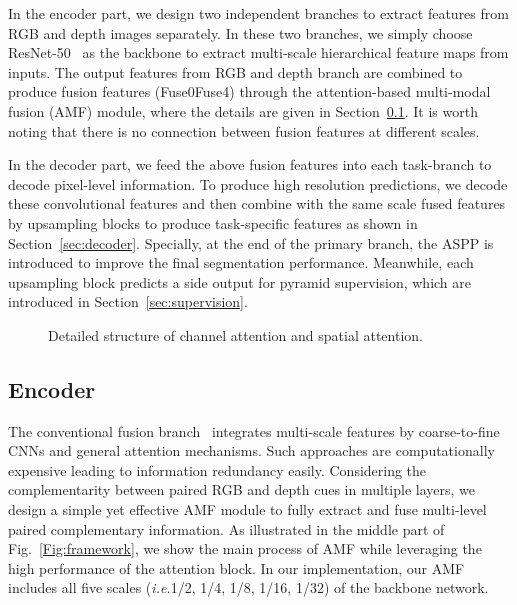 \documentclass[10pt,twocolumn,letterpaper]{article}
\begin{document}
In the encoder part, we design two independent branches to extract features from RGB and depth images separately. In these two branches, we simply choose ResNet-50~\cite{He:CVPR2016} as the backbone to extract multi-scale hierarchical feature maps from inputs. The output features from RGB and depth branch are combined to produce fusion features (Fuse0Fuse4) through the attention-based multi-modal fusion (AMF) module, where the details are given in Section~\ref{sec:encoder}. It is worth noting that there is no connection between fusion features at different scales.

In the decoder part, we feed the above fusion features into each task-branch to decode pixel-level information. To produce high resolution predictions, we decode these convolutional features and then combine with the same scale fused features by upsampling blocks to produce task-specific features as shown in Section~\ref{sec:decoder}. Specially, at the end of the primary branch, the ASPP is introduced to improve the final segmentation performance. Meanwhile, each upsampling block predicts a side output for pyramid supervision, which are introduced in Section~\ref{sec:supervision}. 
\begin{figure}[t]
	\centering
		
	\caption{Detailed structure of channel attention and spatial attention.}
	\label{Fig:Attention}
\end{figure}

\subsection{Encoder}\label{sec:encoder}
The conventional fusion branch~\cite{Hu:ICIP19,Tang:arXiv20} integrates multi-scale features by coarse-to-fine CNNs and general attention mechanisms. Such approaches are computationally expensive leading to information redundancy easily. Considering the complementarity between paired RGB and depth cues in multiple layers, we design a simple yet effective AMF module to fully extract and fuse multi-level paired complementary information. As illustrated in the middle part of Fig.~\ref{Fig:framework}, we show the main process of AMF while leveraging the high performance of the attention block. In our implementation, our AMF includes all five scales (\emph{i.e.}1/2, 1/4, 1/8, 1/16, 1/32) of the backbone network.
\end{document}
